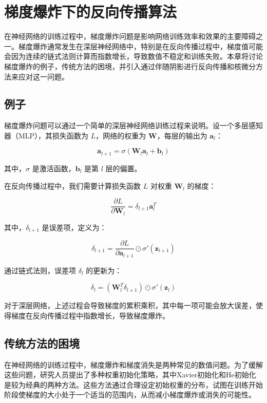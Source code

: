 
\chapter{梯度爆炸下的反向传播算法}

在神经网络的训练过程中，梯度爆炸问题是影响网络训练效率和效果的主要障碍之一。梯度爆炸通常发生在深层神经网络中，特别是在反向传播过程中，梯度值可能会因为连续的链式法则计算而指数增长，导致数值不稳定和训练失败。本章将讨论梯度爆炸的例子，传统方法的困境，并引入通过伴随阴影进行反向传播和核微分方法来应对这一问题。

\section{例子}

梯度爆炸问题可以通过一个简单的深层神经网络训练过程来说明。设一个多层感知器（MLP），其损失函数为 \( L \)，网络的权重为 \(\mathbf{W}\)，每层的输出为 \(\mathbf{a}_l\)：

\[ \mathbf{a}_{l+1} = \sigma(\mathbf{W}_l \mathbf{a}_l + \mathbf{b}_l) \]

其中，\(\sigma\) 是激活函数，\(\mathbf{b}_l\) 是第 \(l\) 层的偏置。

在反向传播过程中，我们需要计算损失函数 \(L\) 对权重 \(\mathbf{W}_l\) 的梯度：

\[ \frac{\partial L}{\partial \mathbf{W}_l} = \delta_{l+1} \mathbf{a}_l^T \]

其中，\(\delta_{l+1}\) 是误差项，定义为：

\[ \delta_{l+1} = \frac{\partial L}{\partial \mathbf{a}_{l+1}} \odot \sigma'(\mathbf{z}_{l+1}) \]

通过链式法则，误差项 \(\delta_l\) 的更新为：

\[ \delta_l = (\mathbf{W}_l^T \delta_{l+1}) \odot \sigma'(\mathbf{z}_l) \]

对于深层网络，上述过程会导致梯度的累积乘积，其中每一项可能会放大误差，使得梯度在反向传播过程中指数增长，导致梯度爆炸。

\section{传统方法的困境}

在神经网络的训练过程中，梯度爆炸和梯度消失是两种常见的数值问题。为了缓解这些问题，研究人员提出了多种权重初始化策略，其中Xavier初始化和He初始化是较为经典的两种方法。这些方法通过合理设定初始权重的分布，试图在训练开始阶段使梯度的大小处于一个适当的范围内，从而减小梯度爆炸或消失的可能性。

